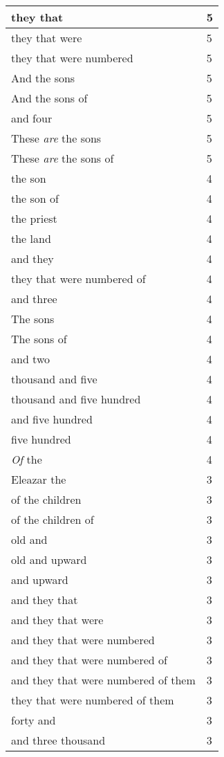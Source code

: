 \begin{center}
\begin{longtable}{|p{3.0in}|p{0.5in}|}
they that & 5\\ \hline 
they that were & 5\\ \hline 
they that were numbered & 5\\ \hline 
And the sons & 5\\ \hline 
And the sons of & 5\\ \hline 
and four & 5\\ \hline 
These \emph{are} the sons & 5\\ \hline 
These \emph{are} the sons of & 5\\ \hline 
the son & 4\\ \hline 
the son of & 4\\ \hline 
the priest & 4\\ \hline 
the land & 4\\ \hline 
and they & 4\\ \hline 
they that were numbered of & 4\\ \hline 
and three & 4\\ \hline 
The sons & 4\\ \hline 
The sons of & 4\\ \hline 
and two & 4\\ \hline 
thousand and five & 4\\ \hline 
thousand and five hundred & 4\\ \hline 
and five hundred & 4\\ \hline 
five hundred & 4\\ \hline 
\emph{Of} the & 4\\ \hline 
Eleazar the & 3\\ \hline 
of the children & 3\\ \hline 
of the children of & 3\\ \hline 
old and & 3\\ \hline 
old and upward & 3\\ \hline 
and upward & 3\\ \hline 
and they that & 3\\ \hline 
and they that were & 3\\ \hline 
and they that were numbered & 3\\ \hline 
and they that were numbered of & 3\\ \hline 
and they that were numbered of them & 3\\ \hline 
they that were numbered of them & 3\\ \hline 
forty and & 3\\ \hline 
and three thousand & 3\\ \hline 

\end{longtable}
\end{center}
